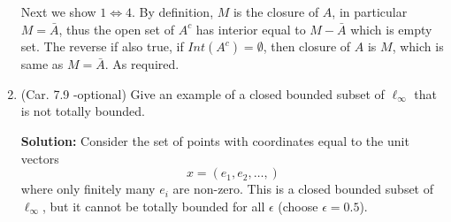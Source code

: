 \documentclass{article}
\def\to{\rightarrow}
\def\QQ{\mathbb Q}
\def\RR{\mathbb R}
\begin{document}
\begin{enumerate}
Next we show $1 \iff 4$. By definition, $M$ is the closure of $A$, in particular $M=\bar{A}$, thus the open set
of $A^c$ has interior equal to $M-\bar{A}$ which is empty set. The reverse if also true, if $Int(A^c)=\emptyset$, then
closure of $A$ is $M$, which is same as $M=\bar{A}$. As required.










\item (Car. 7.9 -optional) Give an example of a closed bounded subset of $\ell_{\infty}$ that is not totally bounded.

\textbf{Solution:} Consider the set of points with coordinates equal to the unit vectors
\[
x=(e_1,e_2,\ldots,)
\]
where only finitely many $e_i$ are non-zero. This is a closed bounded subset of $\ell_{\infty}$, but it
cannot be totally bounded for all $\epsilon$ (choose $\epsilon=0.5$).
\end{enumerate}
\end{document}

